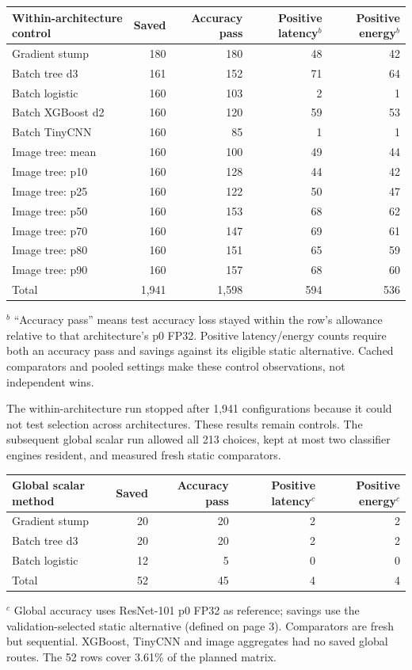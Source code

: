 \documentclass[10pt,a4paper]{article}
\begin{document}
\begin{center}\small
\begin{tabular}{@{}lrrrr@{}}
\toprule Within-architecture control & Saved & Accuracy pass & Positive latency$^{b}$ & Positive energy$^{b}$\\
\midrule
Gradient stump &180&180&48&42\\
Batch tree d3 &161&152&71&64\\
Batch logistic &160&103&2&1\\
Batch XGBoost d2 &160&120&59&53\\
Batch TinyCNN &160&85&1&1\\
Image tree: mean &160&100&49&44\\
Image tree: p10 &160&128&44&42\\
Image tree: p25 &160&122&50&47\\
Image tree: p50 &160&153&68&62\\
Image tree: p70 &160&147&69&61\\
Image tree: p80 &160&151&65&59\\
Image tree: p90 &160&157&68&60\\
\midrule
Total &1,941&1,598&594&536\\
\bottomrule
\end{tabular}
\end{center}
{\footnotesize $^{b}$ ``Accuracy pass'' means test accuracy loss stayed within the row's allowance relative to that architecture's p0 FP32. Positive latency/energy counts require both an accuracy pass and savings against its eligible static alternative. Cached comparators and pooled settings make these control observations, not independent wins.}

The within-architecture run stopped after 1,941 configurations because it could not test selection across architectures. These results remain controls. The subsequent global scalar run allowed all 213 choices, kept at most two classifier engines resident, and measured fresh static comparators.

\begin{center}\small
\begin{tabular}{@{}lrrrr@{}}
\toprule Global scalar method & Saved & Accuracy pass & Positive latency$^{c}$ & Positive energy$^{c}$\\
\midrule
Gradient stump &20&20&2&2\\
Batch tree d3 &20&20&2&2\\
Batch logistic &12&5&0&0\\
\midrule Total &52&45&4&4\\
\bottomrule
\end{tabular}
\end{center}
{\footnotesize $^{c}$ Global accuracy uses ResNet-101 p0 FP32 as reference; savings use the validation-selected static alternative (defined on page 3). Comparators are fresh but sequential. XGBoost, TinyCNN and image aggregates had no saved global routes. The 52 rows cover 3.61\% of the planned matrix.}
\end{document}
